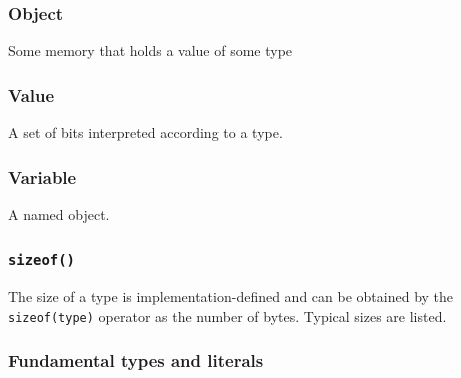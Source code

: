 \documentclass[table, xcdraw]{article}%
\begin{document}
\subsubsection{Object}
Some memory that holds a value of some type

\subsubsection{Value}
A set of bits interpreted according to a type.

\subsubsection{Variable}
A named object.

\subsubsection{\texttt{sizeof()}}
The size of a type is implementation-defined and can be obtained by the \texttt{sizeof(type)} operator as the number of bytes. Typical sizes are listed.

\subsubsection{Fundamental types and literals}
\end{document}
